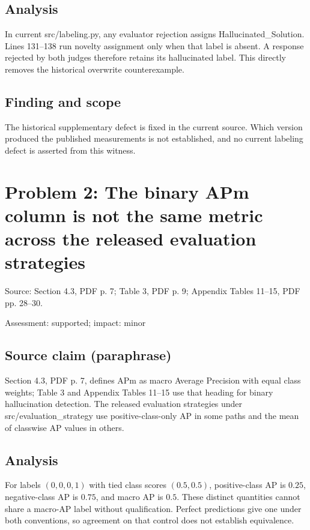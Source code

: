 \documentclass[11pt]{article}
\begin{document}
\subsection*{Analysis}

In current src/labeling.py, any evaluator rejection assigns Hallucinated\_Solution. Lines 131–138 run novelty assignment only when that label is absent. A response rejected by both judges therefore retains its hallucinated label. This directly removes the historical overwrite counterexample.

\subsection*{Finding and scope}

The historical supplementary defect is fixed in the current source. Which version produced the published measurements is not established, and no current labeling defect is asserted from this witness.

\section*{Problem 2: The binary APm column is not the same metric across the released evaluation strategies}

Source: Section 4.3, PDF p. 7; Table 3, PDF p. 9; Appendix Tables 11–15, PDF pp. 28–30.

Assessment: supported; impact: minor

\subsection*{Source claim (paraphrase)}

Section 4.3, PDF p. 7, defines APm as macro Average Precision with equal class weights; Table 3 and Appendix Tables 11–15 use that heading for binary hallucination detection. The released evaluation strategies under src/evaluation\_strategy use positive-class-only AP in some paths and the mean of classwise AP values in others.

\subsection*{Analysis}

For labels \((0,0,0,1)\) with tied class scores \((0.5,0.5)\), positive-class AP is \(0.25\), negative-class AP is \(0.75\), and macro AP is \(0.5\). These distinct quantities cannot share a macro-AP label without qualification. Perfect predictions give one under both conventions, so agreement on that control does not establish equivalence.
\end{document}
